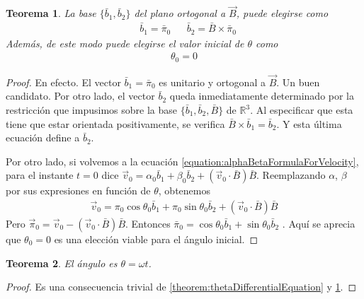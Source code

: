 \documentclass{article}
\newcommand{\realNumbers}{\mathbb{R}}
\newtheorem{theorem}{Teorema}
\begin{document}
  \begin{theorem}
    \label{theorem:constantsThatDefineTheSolution_b1b2theta0}
    La base \(\{\bar{b}_1, \bar{b}_2\}\) del plano ortogonal a \(\vec{B}\), puede elegirse como
    \begin{align}
      \label{equation:basisVectorsb1b2}
      &\bar{b}_1
      =
      \bar{\pi}_0
      &
      &\bar{b}_2
      =
      \bar{B}
      \times
      \bar{\pi}_0
    \end{align}
    Además, de este modo puede elegirse el valor inicial de \(\theta\) como 
    \begin{align}
      \theta_0 = 0
    \end{align}
  \end{theorem}
  \begin{proof}
    En efecto.
    El vector \(\bar{b}_1 = \bar{\pi}_0\) es unitario y ortogonal a \(\vec{B}\).
    Un buen candidato.
    Por otro lado, el vector \(\bar{b}_2\) queda inmediatamente determinado por la restricción que impusimos sobre la base \(\{\bar{b}_1, \bar{b}_2, \bar{B}\}\) de \(\realNumbers^3\).
    Al especificar que esta tiene que estar orientada positivamente, se verifica \(\bar{B} \times \bar{b}_1 = \bar{b}_2\).
    Y esta última ecuación define a \(\bar{b}_2\).

    Por otro lado, si volvemos a la ecuación \eqref{equation:alphaBetaFormulaForVelocity}, para el instante \(t = 0\) dice
    \(\vec{v}_0 = \alpha_0 \bar{b}_1 + \beta_0 \bar{b}_2 + (\vec{v}_0 \cdot \bar{B}) \bar{B}\).
    Reemplazando \(\alpha\), \(\beta\) por sus expresiones en función de \(\theta\), obtenemos
    \begin{align}
      \vec{v}_0
      =
      \pi_0 \cos \theta_0 \bar{b}_1
      + \pi_0 \sin \theta_0 \bar{b}_2
      + (\vec{v}_0 \cdot \bar{B}) \bar{B}
    \end{align}
    Pero \(\vec{\pi}_0 = \vec{v}_0 - (\vec{v}_0 \cdot \bar{B}) \bar{B}\).
    Entonces
    \(
      \bar{\pi}_0
      =
      \cos \theta_0 \bar{b}_1
      + \sin \theta_0 \bar{b}_2
    \)
    .
    Aquí se aprecia que \(\theta_0 = 0\) es una elección viable para el ángulo inicial.
  \end{proof}

  \begin{theorem}
    \label{theorem:thetaSolution}
    El ángulo es \(\theta = \omega t\).
  \end{theorem}
  \begin{proof}
    Es una consecuencia trivial de \ref{theorem:thetaDifferentialEquation} y \ref{theorem:constantsThatDefineTheSolution_b1b2theta0}.
  \end{proof}
\end{document}
